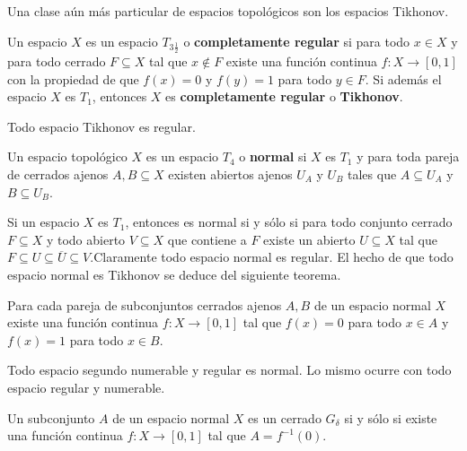 \documentclass[12pt]{report}
\theoremstyle{largebreak}
\newcommand{\cf}[3]{\ensuremath{#1:#2\rightarrow#3}}
\begin{document}
    Una clase aún más particular de espacios topológicos son los espacios Tikhonov.

    \begin{mydef}
        Un espacio $X$ es un espacio $T_{3\frac{1}{2}}$ o \textbf{completamente regular} si para todo $x\in X$ y para todo cerrado $F\subseteq X$ tal que $x\notin F$ existe una función continua $\cf{f}{X}{[0,1]}$ con la propiedad de que $f(x)=0$ y $f(y)=1$ para todo $y\in F$. Si además el espacio $X$ es $T_1$, entonces $X$ es \textbf{completamente regular} o \textbf{Tikhonov}.
    \end{mydef}

    \begin{theor}
        Todo espacio Tikhonov es regular.
    \end{theor}

    \begin{mydef}
        Un espacio topológico $X$ es un espacio $T_4$ o \textbf{normal} si $X$ es $T_1$ y para toda pareja de cerrados ajenos $A,B\subseteq X$ existen abiertos ajenos $U_A$ y $U_B$ tales que $A\subseteq U_A$ y $B\subseteq U_B$.
    \end{mydef}

    \begin{obs}
        Si un espacio $X$ es $T_1$, entonces es normal si y sólo si para todo conjunto cerrado $F\subseteq X$ y todo abierto $V\subseteq X$ que contiene a $F$ existe un abierto $U\subseteq X$ tal que $F\subseteq U\subseteq \overline{U}\subseteq V$.Claramente todo espacio normal es regular. El hecho de que todo espacio normal es Tikhonov se deduce del siguiente teorema.
    \end{obs}

    \begin{theor}
        Para cada pareja de subconjuntos cerrados ajenos $A,B$ de un espacio normal $X$ existe una función continua $\cf{f}{X}{[0,1]}$ tal que $f(x)=0$ para todo $x\in A$ y $f(x)=1$ para todo $x\in B$.
    \end{theor}
    
    \begin{obs}
        Todo espacio segundo numerable y regular es normal. Lo mismo ocurre con todo espacio regular y numerable.
    \end{obs}

    \begin{cor}
        Un subconjunto $A$ de un espacio normal $X$ es un cerrado $G_\delta$ si y sólo si existe una función continua $\cf{f}{X}{[0,1]}$ tal que $A=f^{-1}(0)$.
    \end{cor}
\end{document}
